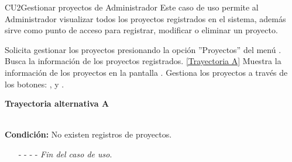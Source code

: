 	\begin{UseCase}{CU2}{Gestionar proyectos de Administrador}{
		Este caso de uso permite al Administrador visualizar todos los proyectos registrados en el sistema, además sirve como punto de acceso para registrar, modificar o eliminar un proyecto.
	}
	\end{UseCase}
	\begin{UCtrayectoria}
		\UCpaso[\UCactor] Solicita gestionar los proyectos presionando la opción ''Proyectos'' del menú .
		\UCpaso[\UCsist] Busca la información de los proyectos registrados. \hyperlink{CU2:TAA}{[Trayectoria A]}
		\UCpaso[\UCsist] Muestra la información de los proyectos en la pantalla .
		\UCpaso[\UCactor] Gestiona los proyectos a través de los botones: , \editar  y \eliminar. \label{P4}
	\end{UCtrayectoria}		
	\hypertarget{CU2:TAA}{\textbf{Trayectoria alternativa A}}\\
\noindent \textbf{Condición:} No existen registros de proyectos.
\begin{enumerate}
	\UCpaso[\UCsist] Muestra el mensaje  en la pantalla  para indicar que no hay registros de proyectos para mostrar.
	\item[- -] - - {\em {Fin del caso de uso}}.%
\end{enumerate}

